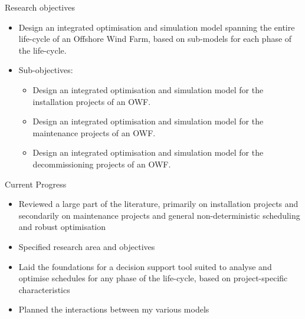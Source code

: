 \documentclass{beamer}
\begin{document}
\begin{frame}{Research objectives}
  \begin{itemize}
  	\item Design an integrated optimisation and simulation model spanning the entire life-cycle of an Offshore Wind Farm, based on sub-models for each phase of the life-cycle.
  	\item Sub-objectives:
  	\begin{itemize}
  		\item Design an integrated optimisation and simulation model for the installation projects of an OWF. 
  		\item Design an integrated optimisation and simulation model for the maintenance projects of an OWF. 
  		\item Design an integrated optimisation and simulation model for the decommissioning projects of an OWF. 
  	\end{itemize}
  \end{itemize}
\end{frame}


\begin{frame}{Current Progress}
   \begin{itemize}
  	\item Reviewed a large part of the literature, primarily on installation projects and secondarily on maintenance projects and general non-deterministic scheduling and robust optimisation
	\item Specified research area and objectives
  	\item Laid the foundations for a decision support tool suited to analyse and optimise schedules for any phase of the life-cycle, based on project-specific characteristics
  	\item Planned the interactions between my various models	
  \end{itemize}
\end{frame}
\end{document}
